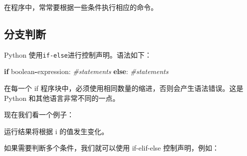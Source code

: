 \documentclass[]{ctexbook}
\newenvironment{Shaded}{\begin{snugshade}}{\end{snugshade}}
\newcommand{\BuiltInTok}[1]{#1}
\newcommand{\CommentTok}[1]{\textcolor[rgb]{0.56,0.35,0.01}{\textit{#1}}}
\newcommand{\ControlFlowTok}[1]{\textcolor[rgb]{0.13,0.29,0.53}{\textbf{#1}}}
\newcommand{\DecValTok}[1]{\textcolor[rgb]{0.00,0.00,0.81}{#1}}
\newcommand{\NormalTok}[1]{#1}
\newcommand{\OperatorTok}[1]{\textcolor[rgb]{0.81,0.36,0.00}{\textbf{#1}}}
\newcommand{\StringTok}[1]{\textcolor[rgb]{0.31,0.60,0.02}{#1}}
\begin{document}
在程序中，常常要根据一些条件执行相应的命令。

\hypertarget{ux5206ux652fux5224ux65ad}{%
\subsection{分支判断}\label{ux5206ux652fux5224ux65ad}}

Python 使用\texttt{if-else}进行控制声明。语法如下：

\begin{Shaded}
\begin{Highlighting}[]
\ControlFlowTok{if}\NormalTok{ boolean}\OperatorTok{-}\NormalTok{expression:}
   \CommentTok{#statements}
\ControlFlowTok{else}\NormalTok{:}
   \CommentTok{#statements}
\end{Highlighting}
\end{Shaded}

在每一个 if 程序块中，必须使用相同数量的缩进，否则会产生语法错误。这是 Python 和其他语言非常不同的一点。

现在我们看一个例子：

\begin{Shaded}
\end{Shaded}

运行结果将根据 i 的值发生变化。

如果需要判断多个条件，我们就可以使用 if-elif-else 控制声明，例如：
\end{document}
